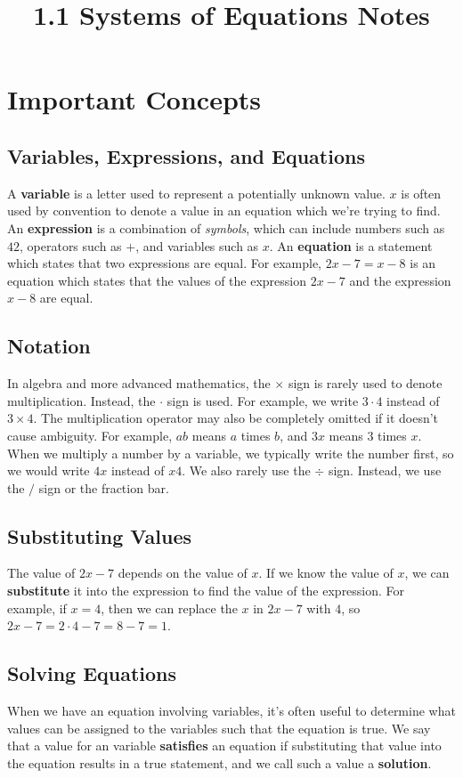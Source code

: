 \documentclass{article}
\title{1.1 Systems of Equations Notes}
\author{}
\date{}
\begin{document}
    \maketitle
    \section*{Important Concepts}
    \subsection*{Variables, Expressions, and Equations}
    A \textbf{variable} is a letter used to represent a potentially unknown value.
    $x$ is often used by convention to denote a value in an equation which we're trying to find.
    An \textbf{expression} is a combination of \emph{symbols}, which can include numbers such as $42$, operators such as $+$, and variables such as $x$.
    An \textbf{equation} is a statement which states that two expressions are equal.
    For example, $2x - 7 = x - 8$ is an equation which states that the values of the expression $2x - 7$ and the expression $x - 8$ are equal.
    \subsection*{Notation}
    In algebra and more advanced mathematics, the $\times$ sign is rarely used to denote multiplication.
    Instead, the $\cdot$ sign is used.
    For example, we write $3 \cdot 4$ instead of $3 \times 4$.
    The multiplication operator may also be completely omitted if it doesn't cause ambiguity.
    For example, $ab$ means $a$ times $b$, and $3x$ means $3$ times $x$.
    When we multiply a number by a variable, we typically write the number first, so we would write $4x$ instead of $x4$.
    We also rarely use the $\div$ sign.
    Instead, we use the $/$ sign or the fraction bar.
    \subsection*{Substituting Values}
    The value of $2x - 7$ depends on the value of $x$.
    If we know the value of $x$, we can \textbf{substitute} it into the expression to find the value of the expression.
    For example, if $x = 4$, then we can replace the $x$ in $2x - 7$ with $4$, so $2x - 7 = 2 \cdot 4 - 7 = 8 - 7 = 1$.
    \subsection*{Solving Equations}
    When we have an equation involving variables, it's often useful to determine what values can be assigned to the variables such that the equation is true.
    We say that a value for an variable \textbf{satisfies} an equation if substituting that value into the equation results in a true statement, and we call such a value a \textbf{solution}.
\end{document}
